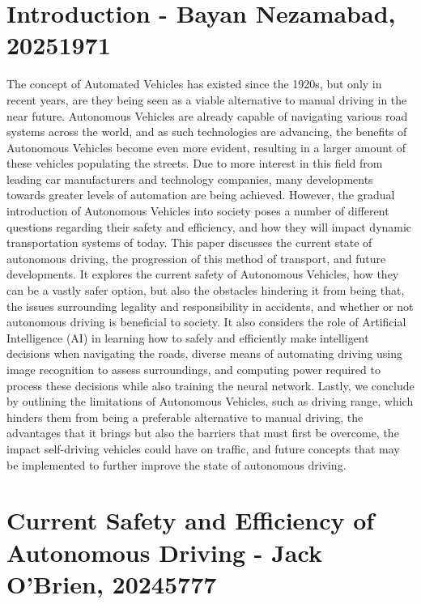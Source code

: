 \documentclass{article}
\begin{document}
\section{Introduction - Bayan Nezamabad, 20251971}
The concept of Automated Vehicles has existed since the 1920s, but only in recent years, are they being seen as a viable alternative to manual driving in the near future. Autonomous Vehicles are already capable of navigating various road systems across the world, and as such technologies are advancing, the benefits of Autonomous Vehicles become even more evident, resulting in a larger amount of these vehicles populating the streets. Due to more interest in this field from leading car manufacturers and technology companies, many developments towards greater levels of automation are being achieved. However, the gradual introduction of Autonomous Vehicles into society poses a number of different questions regarding their safety and efficiency, and how they will impact dynamic transportation systems of today. 
\bigbreak
This paper discusses the current state of autonomous driving, the progression of this method of transport, and future developments. It explores the current safety of Autonomous Vehicles, how they can be a vastly safer option, but also the obstacles hindering it from being that, the issues surrounding legality and responsibility in accidents, and whether or not autonomous driving is beneficial to society. It also considers the role of Artificial Intelligence (AI) in learning how to safely and efficiently make intelligent decisions when navigating the roads, diverse means of automating driving using image recognition to assess surroundings, and computing power required to process these decisions while also training the neural network. Lastly, we conclude by outlining the limitations of Autonomous Vehicles, such as driving range, which hinders them from being a preferable alternative to manual driving, the advantages that it brings but also the barriers that must first be overcome, the impact self-driving vehicles could have on traffic, and future concepts that may be implemented to further improve the state of autonomous driving.

\section{Current Safety and Efficiency of Autonomous Driving - Jack O'Brien, 20245777}
\end{document}
